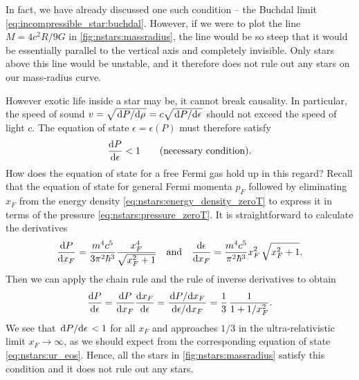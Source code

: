 In fact, we have already discussed one such condition -- the Buchdal limit \eqref{eq:incompressible_star:buchdal}.
However, if we were to plot the line $M = 4 c^2 R / 9 G$ in \cref{fig:nstars:massradius}, the line would be so steep that it would be essentially parallel to the vertical axis and completely invisible.
Only stars above this line would be unstable, and it therefore does not rule out any stars on our mass-radius curve.

However exotic life inside a star may be, it cannot break causality. 
In particular, the speed of sound $v = \sqrt{\odv{P}/{\rho}} = c \sqrt{\odv{P}/{\epsilon}}$ should not exceed the speed of light $c$.
The equation of state $\epsilon = \epsilon(P)$ must therefore satisfy
\begin{equation}
	\odv{P}{\epsilon} < 1
	\qquad \text{(necessary condition)} .
\end{equation}
How does the equation of state for a free Fermi gas hold up in this regard?
Recall that the equation of state for general Fermi momenta $p_F$ followed by eliminating $x_F$ from the energy density \eqref{eq:nstars:energy_density_zeroT} to express it in terms of the pressure \eqref{eq:nstars:pressure_zeroT}.
It is straightforward to calculate the derivatives
\begin{equation}
	\odv{P}{x_F} = \frac{m^4 c^5}{3 \pi^2 \hbar^3} \frac{x_F^4}{\sqrt{x_F^2 + 1}}
	\quad \text{and} \quad
	\odv{\epsilon}{x_F} = \frac{m^4 c^5}{\pi^2 \hbar^3} x_F^2 \, \sqrt{x_F^2 + 1} .
\end{equation}
Then we can apply the chain rule and the rule of inverse derivatives to obtain
\begin{equation}
	\odv{P}{\epsilon} = 
	\odv{P}{x_F} \odv{x_F}{\epsilon} =
	\frac{\odv{P}/{x_F}}{\odv{\epsilon}/{x_F}} =
	\frac13 \, \frac{1}{1+1/x_F^2}.
\label{eq:nstars:dPde}
\end{equation}
We see that $\odv{P}/{\epsilon} < 1$ for all $x_F$ and approaches $1/3$ in the ultra-relativistic limit $x_F \rightarrow \infty$, as we should expect from the corresponding equation of state \eqref{eq:nstars:ur_eos}.
Hence, all the stars in \cref{fig:nstars:massradius} satisfy this condition and it does not rule out any stars.

